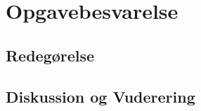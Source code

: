 \newpage
\section{Opgavebesvarelse}\label{sec:OpgaveBesvarelse}

\subsection{Redegørelse}\label{sec:Redegorsel}


\newpage
\subsection{Diskussion og Vuderering}



\newpage